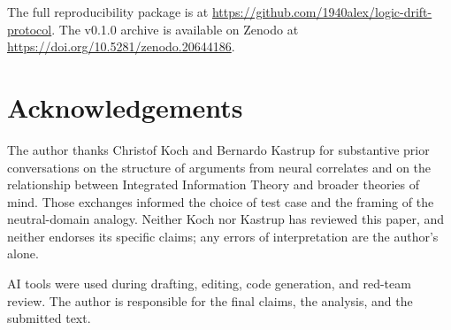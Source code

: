 \documentclass[11pt,letterpaper]{article}
\begin{document}
The full reproducibility package is at \url{https://github.com/1940alex/logic-drift-protocol}. The v0.1.0 archive is available on Zenodo at \url{https://doi.org/10.5281/zenodo.20644186}.

\section*{Acknowledgements}

The author thanks Christof Koch and Bernardo Kastrup for substantive prior conversations on the structure of arguments from neural correlates and on the relationship between Integrated Information Theory and broader theories of mind. Those exchanges informed the choice of test case and the framing of the neutral-domain analogy. Neither Koch nor Kastrup has reviewed this paper, and neither endorses its specific claims; any errors of interpretation are the author's alone.

AI tools were used during drafting, editing, code generation, and red-team review. The author is responsible for the final claims, the analysis, and the submitted text.



\end{document}
